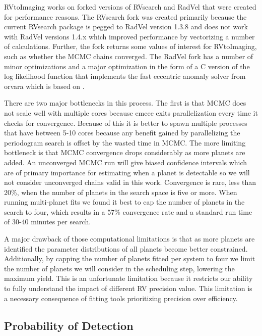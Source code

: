 RVtoImaging works on forked versions of RVsearch and RadVel that were created
for performance reasons. The RVsearch fork was created primarily because the
current RVsearch package is pegged to RadVel version 1.3.8 and does not work
with RadVel versions 1.4.x which improved performance by vectorizing a number
of calculations. Further, the fork returns some values of interest for
RVtoImaging, such as whether the MCMC chains converged. The RadVel fork has a
number of minor optimizations and a major optimization in the form of a C
version of the log likelihood function that implements the fast eccentric
anomaly solver from orvara \citep{brandtOrvaraEfficient2021} which is based on
\citep{raposo-pulidoEfficientCode2017}.

There are two major bottlenecks in this process. The first is that MCMC does
not scale well with multiple cores because emcee exits parallelization every
time it checks for convergence. Because of this it is better to spawn multiple
processes that have between 5-10 cores because any benefit gained by
parallelizing the periodogram search is offset by the wasted time in MCMC. The
more limiting bottleneck is that MCMC convergence drops considerably as more
planets are added. An unconverged MCMC run will give biased confidence
intervals which are of primary importance for estimating when a planet is
detectable so we will not consider unconverged chains valid in this work.
Convergence is rare, less than 20\%, when the number of planets in the search
space is five or more. When running multi-planet fits we found it best to cap
the number of planets in the search to four, which results in a 57\%
convergence rate and a standard run time of 30-40 minutes per search.

A major drawback of those computational limitations is that as more planets are
identified the parameter distributions of all planets become better
constrained. Additionally, by capping the number of planets fitted per system
to four we limit the number of planets we will consider in the scheduling step,
lowering the maximum yield. This is an unfortunate limitation because it restricts
our ability to fully understand the impact of different RV precision value.
This limitation is a necessary consequence of fitting tools prioritizing
precision over efficiency.

\subsection{Probability of Detection}

